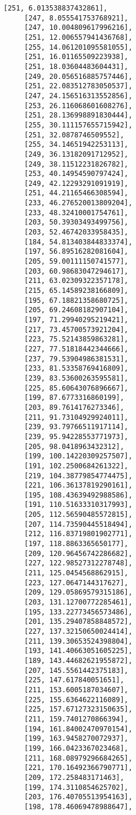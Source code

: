 \documentclass[11pt]{article}
\begin{document}
\begin{tcolorbox}[breakable, size=fbox, boxrule=.5pt, pad at break*=1mm, opacityfill=0]
\begin{Verbatim}[commandchars=\\\{\}]
     [251, 6.013538837432861],
     [247, 8.055541753768921],
     [247, 10.004809617996216],
     [251, 12.006557941436768],
     [255, 14.061201095581055],
     [251, 16.01165509223938],
     [251, 18.03604483604431],
     [249, 20.056516885757446],
     [251, 22.083512783050537],
     [247, 24.156516313552856],
     [253, 26.116068601608276],
     [251, 28.136998891830444],
     [255, 30.111157655715942],
     [251, 32.0878746509552],
     [255, 34.14651942253113],
     [249, 36.13182091712952],
     [249, 38.11512231826782],
     [253, 40.14954590797424],
     [249, 42.12293291091919],
     [251, 44.21165466308594],
     [233, 46.276520013809204],
     [233, 48.32410001754761],
     [203, 50.39303493499756],
     [203, 52.46742033958435],
     [184, 54.813403844833374],
     [197, 56.89516282081604],
     [205, 59.00111150741577],
     [203, 60.98683047294617],
     [211, 63.02309322357178],
     [215, 65.14589238166809],
     [195, 67.18821358680725],
     [205, 69.24608182907104],
     [197, 71.29940295219421],
     [217, 73.45700573921204],
     [223, 75.52143859863281],
     [227, 77.51818442344666],
     [237, 79.53904986381531],
     [233, 81.53358769416809],
     [239, 83.53600263595581],
     [225, 85.60643076896667],
     [199, 87.6773316860199],
     [203, 89.7614176273346],
     [211, 91.73104929924011],
     [239, 93.79766511917114],
     [239, 95.94228553771973],
     [205, 98.0418963432312],
     [199, 100.14220309257507],
     [191, 102.2500684261322],
     [219, 104.38779854774475],
     [221, 106.36137819290161],
     [195, 108.43639492988586],
     [191, 110.51633310317993],
     [205, 112.56590485572815],
     [207, 114.73590445518494],
     [212, 116.83719801902771],
     [197, 118.8863365650177],
     [209, 120.96456742286682],
     [227, 122.98527312278748],
     [211, 125.0454568862915],
     [223, 127.0647144317627],
     [209, 129.05869579315186],
     [203, 131.12700772285461],
     [195, 133.22773456573486],
     [201, 135.29407858848572],
     [227, 137.32150650024414],
     [211, 139.30653524398804],
     [193, 141.40663051605225],
     [189, 143.44682621955872],
     [207, 145.5561442375183],
     [225, 147.617840051651],
     [211, 153.6005187034607],
     [225, 155.6364622116089],
     [225, 157.67127323150635],
     [211, 159.7401270866394],
     [194, 161.84002470970154],
     [199, 163.9458270072937],
     [199, 166.0423367023468],
     [211, 168.08979296684265],
     [221, 170.16492366790771],
     [209, 172.258483171463],
     [199, 174.3110854625702],
     [203, 176.40705513954163],
     [198, 178.46069478988647],

\end{Verbatim}
\end{tcolorbox}
\end{document}
